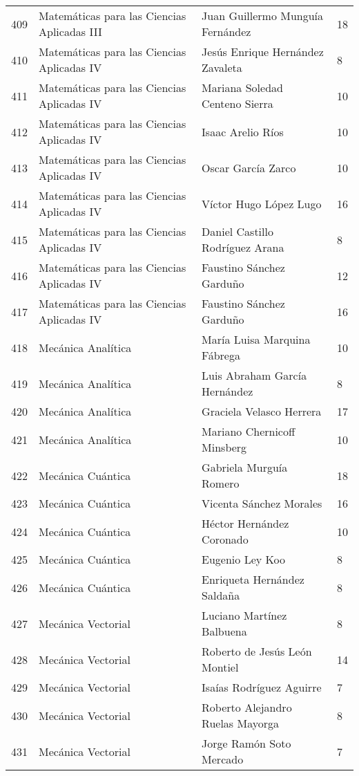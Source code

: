 \begin{table}[ht]
\begin{tabular}{rlll}
  409 & Matemáticas para las Ciencias Aplicadas III & Juan Guillermo Munguía Fernández & 18 \\ 
  410 & Matemáticas para las Ciencias Aplicadas IV & Jesús Enrique Hernández Zavaleta & 8 \\ 
  411 & Matemáticas para las Ciencias Aplicadas IV & Mariana Soledad Centeno Sierra & 10 \\ 
  412 & Matemáticas para las Ciencias Aplicadas IV & Isaac Arelio Ríos & 10 \\ 
  413 & Matemáticas para las Ciencias Aplicadas IV & Oscar García Zarco & 10 \\ 
  414 & Matemáticas para las Ciencias Aplicadas IV & Víctor Hugo López Lugo & 16 \\ 
  415 & Matemáticas para las Ciencias Aplicadas IV & Daniel Castillo Rodríguez Arana & 8 \\ 
  416 & Matemáticas para las Ciencias Aplicadas IV & Faustino Sánchez Garduño & 12 \\ 
  417 & Matemáticas para las Ciencias Aplicadas IV & Faustino Sánchez Garduño & 16 \\ 
  418 & Mecánica Analítica & María Luisa Marquina Fábrega & 10 \\ 
  419 & Mecánica Analítica & Luis Abraham García Hernández & 8 \\ 
  420 & Mecánica Analítica & Graciela Velasco Herrera & 17 \\ 
  421 & Mecánica Analítica & Mariano Chernicoff Minsberg & 10 \\ 
  422 & Mecánica Cuántica & Gabriela Murguía Romero & 18 \\ 
  423 & Mecánica Cuántica & Vicenta Sánchez Morales & 16 \\ 
  424 & Mecánica Cuántica & Héctor Hernández Coronado & 10 \\ 
  425 & Mecánica Cuántica & Eugenio Ley Koo & 8 \\ 
  426 & Mecánica Cuántica & Enriqueta Hernández Saldaña & 8 \\ 
  427 & Mecánica Vectorial & Luciano Martínez Balbuena & 8 \\ 
  428 & Mecánica Vectorial & Roberto de Jesús León Montiel & 14 \\ 
  429 & Mecánica Vectorial & Isaías Rodríguez Aguirre & 7 \\ 
  430 & Mecánica Vectorial & Roberto Alejandro Ruelas Mayorga & 8 \\ 
  431 & Mecánica Vectorial & Jorge Ramón Soto Mercado & 7 \\ 

\end{tabular}
\end{table}
